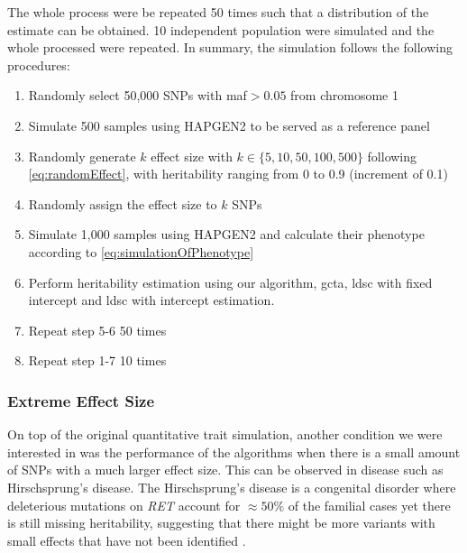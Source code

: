 			The whole process were be repeated 50 times such that a distribution of the estimate can be obtained.
			10 independent population were simulated and the whole processed were repeated.
			In summary, the simulation follows the following procedures:
			\begin{enumerate}
				\item Randomly select 50,000 \glspl{SNP} with \gls{maf}$>0.05$ from chromosome 1
				\item Simulate 500 samples using HAPGEN2 to be served as a reference panel
				\item Randomly generate $k$ effect size with $k \in \{5,10,50,100,500\}$ following \cref{eq:randomEffect}, with heritability ranging from 0 to 0.9 (increment of 0.1)
				\item Randomly assign the effect size to $k$ \glspl{SNP}
				\item Simulate 1,000 samples using HAPGEN2 and calculate their phenotype according to \cref{eq:simulationOfPhenotype}
				\item Perform heritability estimation using our algorithm, \gls{gcta}, \gls{ldsc} with fixed intercept and \gls{ldsc} with intercept estimation.
				\item Repeat step 5-6 50 times
				\item Repeat step 1-7 10 times
			\end{enumerate}
		
		\subsubsection{Extreme Effect Size}
		On top of the original quantitative trait simulation, another condition we were interested in was the performance of the algorithms when there is a small amount of \glspl{SNP} with a much larger effect size.
		This can be observed in disease such as Hirschsprung's disease.
		The Hirschsprung's disease is a congenital disorder where deleterious mutations on \textit{RET} account for $\approx50\%$ of the familial cases yet there is still missing heritability, suggesting that there might be more variants with small effects that have not been identified \citep{Gui2013}.
		
